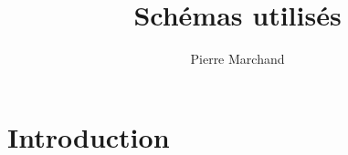 \documentclass{article}
\theoremstyle{plain}
\numberwithin{equation}{section} %
\begin{document}
\title{Sch\'emas utilis\'es}


\author{Pierre Marchand
}


\maketitle




\section{Introduction}
\end{document}
